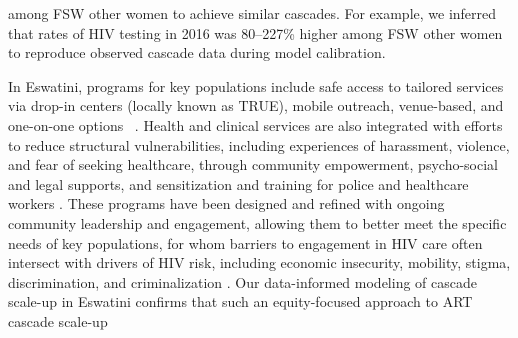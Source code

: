 among FSW \vs other women to achieve similar cascades.
For example, we inferred that rates of HIV testing in 2016 was 80--227\% higher
among FSW \vs other women to reproduce observed cascade data during model calibration.
\par %
In Eswatini, programs for key populations include safe access to tailored services via
drop-in centers (locally known as TRUE), mobile outreach, venue-based, and one-on-one options~%
\cite{EswIBBS2022}.
Health and clinical services are also integrated with
efforts to reduce structural vulnerabilities, including
experiences of harassment, violence, and fear of seeking healthcare,
through community empowerment, psycho-social and legal supports, and
sensitization and training for police and healthcare workers \cite{EswIBBS2022}.
These programs have been designed and refined with ongoing community leadership and engagement,
allowing them to better meet the specific needs of key populations,
for whom barriers to engagement in HIV care often intersect with drivers of HIV risk,
including economic insecurity, mobility, stigma, discrimination, and criminalization
\cite{Lancaster2016sr,Wanyenze2016,Schwartz2017,Schmidt-Sane2022,Camlin2019,Baral2019}.
Our data-informed modeling of cascade scale-up in Eswatini confirms that
such an equity-focused approach to ART cascade scale-up
